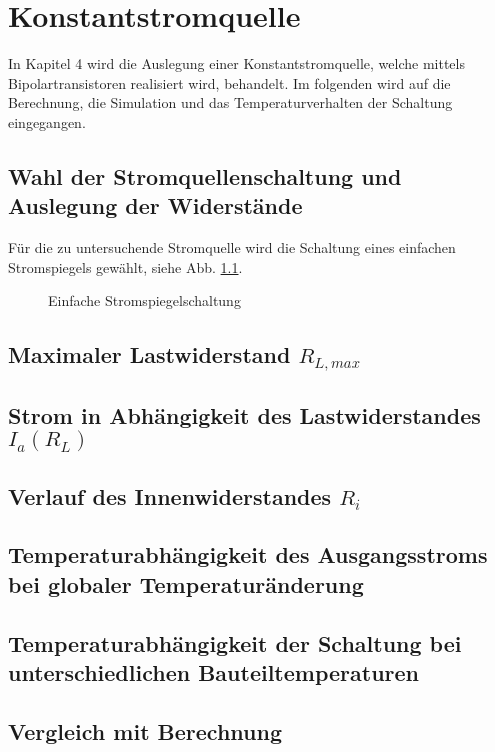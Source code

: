 \def\figpath{tex/4_Konstantstromquelle/pictures}
\graphicspath{{tex/4_Konstantstromquelle/pictures/}}

\chapter{Konstantstromquelle}
In Kapitel 4 wird die Auslegung einer Konstantstromquelle, welche mittels Bipolartransistoren realisiert wird, behandelt. Im folgenden wird auf die Berechnung, die Simulation und das Temperaturverhalten der Schaltung eingegangen. 

\section{Wahl der Stromquellenschaltung und Auslegung der Widerstände}
Für die zu untersuchende Stromquelle wird die Schaltung eines einfachen Stromspiegels gewählt, siehe Abb. \ref{fig_Kap4_01:Stromspiegel01}. 

\begin{figure}[H]
	\centering
	\def\svgwidth{0.8\textwidth}
	
	\caption{Einfache Stromspiegelschaltung} 
	\label{fig_Kap4_01:Stromspiegel01} 
\end{figure}



\section{Maximaler Lastwiderstand $R_{L,max}$}

\section{Strom in Abhängigkeit des Lastwiderstandes $I_a(R_L)$}

\section{Verlauf des Innenwiderstandes $R_i$}

\section{Temperaturabhängigkeit des Ausgangsstroms bei globaler Temperaturänderung}

\section{Temperaturabhängigkeit der Schaltung bei unterschiedlichen Bauteiltemperaturen}

\section{Vergleich mit Berechnung}